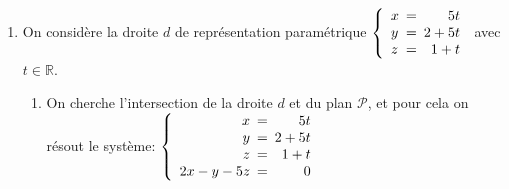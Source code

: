 \documentclass[10pt]{article}
\providecommand{\R}{\mathbb{R}}
\providecommand{\ds}{\displaystyle}
\begin{document}
\begin{enumerate}[resume]
\begin{enumerate}
		\item 
Le point M est le point d'intersection de $\mathcal{D}$ et de $\Delta$ donc ses coordonnées $\left (x\,; y\;;z\right )$ sont solutions du système:
$\left \{
\begin{array}{r !{=} l}
x&2+t\\
y&4+ 2 t\\
z&0\\
x & 3+2t'\\
y & 1-t'\\
z & 1+t'
\end{array}
\right . $
		
On a donc 	
$\left \{
\begin{array}{r !{=} l}
2+t & 3+2t'\\
4+2t & 1-t'\\
0 & 1+t'
\end{array}
\right . $
ou encore
$\left \{
\begin{array}{r !{=} l}
t & -1\\
-1 & t'
\end{array}
\right . $

$\left \{
\begin{array}{r !{=} l}
x&2+t\\
y&4+ 2 t\\
z&0
\end{array}
\right . $	
donc
$\left \{
\begin{array}{r !{=} l}
x&1\\
y&2\\
z&0
\end{array}
\right . $

Donc  le point M a pour coordonnées (1~;~2~;~0).

		\item 
$\begin{gathered}\text{MM}' = \ds\sqrt{(x_{\text{M}'} - x_{\text{M}})^2+(y_{\text{M}'} - y_{\text{M}})^2+ (z_{\text{M}'} - z_{\text{M}})^2}\\
\phantom{\text{MM}'}
=\ds\sqrt{(3-1)^2+(1-2)^2+(1-0)^2}
=\ds\sqrt{4+1+1}
=\ds\sqrt{6}\end{gathered}$
	\end{enumerate}
	
\item On considère la droite $d$ de représentation paramétrique 
$\left\{\begin{array}{l !{=} r}
x & 5t\\y & 2 + 5t \\z &1 + t\end{array}\right.$ avec $t \in \R$.
	\begin{enumerate}
		\item 
On cherche	l'intersection de la droite $d$ et du plan $\mathcal{P}$, et pour cela on résout le système:
$\left\{\begin{array}{r !{=} r}
x & 5t\\y & 2 + 5t \\z &1 + t \\ 2x-y-5z & 0\end{array}\right.$


\end{enumerate}
\end{enumerate}
\end{document}
